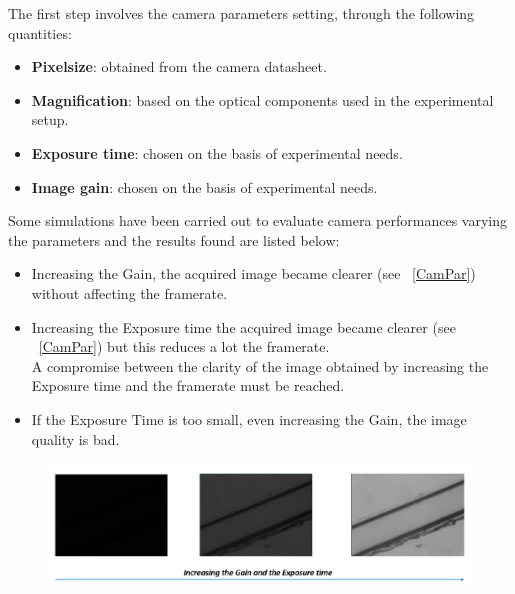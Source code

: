 \documentclass[journal]{IEEEtran}
\theoremstyle{definition}
\theoremstyle{remark}
\begin{document}
The first step involves the camera parameters setting, through the following quantities:

\begin{itemize}
	\item \textbf{Pixelsize}: obtained from the camera datasheet.
	\item \textbf{Magnification}: based on the optical components used in the experimental setup.
	\item \textbf{Exposure time}: chosen on the basis of experimental needs.
	\item \textbf{Image gain}: chosen on the basis of experimental needs.
\end{itemize}

Some simulations have been carried out to evaluate camera performances varying the parameters and the results found are listed below:
\begin{itemize}
	\item Increasing the Gain, the acquired image became clearer (see ~\fig\ref{CamPar}) without affecting the framerate.
	\item Increasing the Exposure time the acquired image became clearer (see ~\fig\ref{CamPar}) but this reduces a lot the framerate. 
	\\A compromise between the clarity of the image obtained by increasing the Exposure time and the framerate must be reached.
	\item If the Exposure Time is too small, even increasing the Gain, the image quality is bad.
\end{itemize}

\begin{figure}[h]
	\centering
	\includegraphics[width=1\columnwidth]{images/CameraParameters}
\end{figure}
\end{document}
